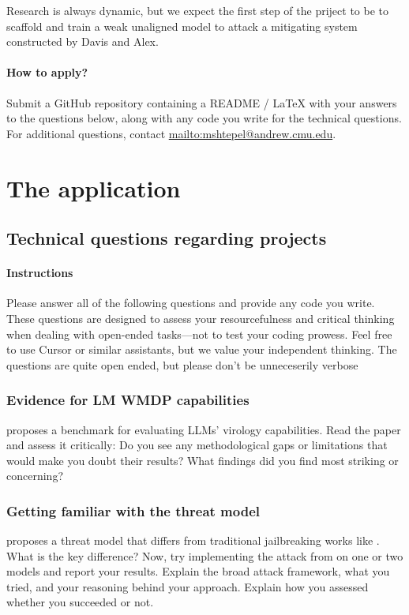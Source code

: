 \documentclass[11pt]{article}
\begin{document}
Research is always dynamic, but we expect the first step of the priject to be to scaffold and train a weak unaligned model to attack a mitigating system constructed by Davis and Alex.

\paragraph{How to apply?}
Submit a GitHub repository containing a README / LaTeX with your answers to the questions below, along with any code you write for the technical questions.
For additional questions, contact \url{mailto:mshtepel@andrew.cmu.edu}.




\section{The application}




\subsection{Technical questions regarding projects}

\paragraph{Instructions}
Please answer all of the following questions and provide any code you write.
These questions are designed to assess your resourcefulness and critical thinking when dealing with open-ended tasks---not to test your coding prowess.
Feel free to use Cursor or similar assistants, but we value your independent thinking.
The questions are quite open ended, but please don't be unneceserily verbose



\subsubsection{Evidence for LM WMDP capabilities}
\cite{gotting2025virology} proposes a benchmark for evaluating LLMs' virology capabilities.
Read the paper and assess it critically: Do you see any methodological gaps or limitations that would make you doubt their results?
What findings did you find most striking or concerning?  

\subsubsection{Getting familiar with the threat model}
\cite{jones2024adversariesb} proposes a threat model that differs from traditional jailbreaking works like \cite{chao2024jailbreakinga}.
What is the key difference?
Now, try implementing the attack from \cite{jones2024adversariesb} on one or two models and report your results.
Explain the broad attack framework, what you tried, and your reasoning behind your approach. 
Explain how you assessed whether you succeeded or not.
\end{document}

